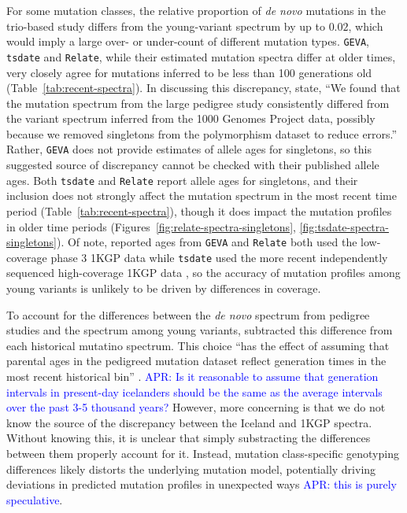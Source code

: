 \documentclass[]{article}
\newcommand{\aprcomment}[1]{{\textcolor{blue}{APR: #1}}}
\newcommand{\GEVA}{\texttt{GEVA}\xspace}
\newcommand{\tsdate}{\texttt{tsdate}\xspace}
\newcommand{\relate}{\texttt{Relate}\xspace}
\begin{document}
For some mutation classes, the relative proportion of \emph{de novo} mutations
in the trio-based study differs from the young-variant spectrum by up to
$0.02$, which would imply a large over- or under-count of different mutation
types. \GEVA, \tsdate and \relate, while their estimated mutation spectra
differ at older times, very closely agree for mutations inferred to be less
than 100 generations old (Table~\ref{tab:recent-spectra}). In discussing this
discrepancy, \citet{wang2023human} state, ``We found that the mutation spectrum
from the large pedigree study consistently differed from the variant spectrum
inferred from the 1000 Genomes Project data, possibly because we removed
singletons from the polymorphism dataset to reduce errors.'' Rather, \GEVA does
not provide estimates of allele ages for singletons, so this suggested source
of discrepancy cannot be checked with their published allele ages. Both \tsdate
and \relate report allele ages for singletons, and their inclusion does not
strongly affect the mutation spectrum in the most recent time period
(Table~\ref{tab:recent-spectra}), though it does impact the mutation profiles
in older time periods (Figures~\ref{fig:relate-spectra-singletons},
\ref{fig:tsdate-spectra-singletons}). Of note, reported ages from \GEVA and
\relate both used the low-coverage phase 3 1KGP data while \tsdate used the
more recent independently sequenced high-coverage 1KGP data
\citep{byrska2022high}, so the accuracy of mutation profiles among young
variants is unlikely to be driven by differences in coverage.

To account for the differences between the \emph{de novo} spectrum from
pedigree studies \citep{jonsson2017parental} and the spectrum among young
variants, \citet{wang2023human} subtracted this difference from each historical
mutatino spectrum. This choice ``has the effect of assuming that parental ages
in the pedigreed mutation dataset reflect generation times in the most recent
historical bin'' \citep{wang2023human}. \aprcomment{Is it reasonable to assume
    that generation intervals in present-day icelanders should be the same as
the average intervals over the past 3-5 thousand years?} However, more
concerning is that we do not know the source of the discrepancy between the
Iceland and 1KGP spectra. Without knowing this, it is unclear that simply
substracting the differences between them properly account for it. Instead,
mutation class-specific genotyping differences likely distorts the underlying
mutation model, potentially driving deviations in predicted mutation profiles
in unexpected ways \aprcomment{this is purely speculative}.
\end{document}
